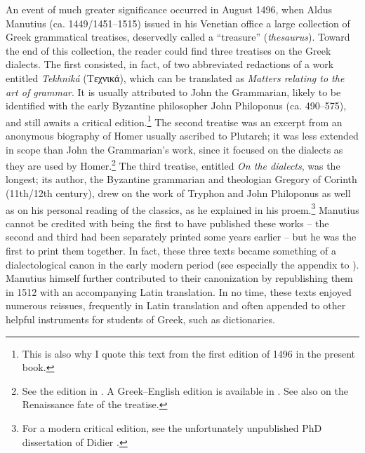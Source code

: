 An event of much greater significance occurred in August 1496, when Aldus Manutius (ca. 1449/1451–1515) issued in his Venetian office a large collection of Greek grammatical treatises, deservedly called a “treasure” (\textit{thesaurus}). Toward the end of this collection, the reader could find three treatises on the Greek dialects. The first consisted, in fact, of two abbreviated redactions of a work entitled \textit{Tekhniká} (Tεχνικά), which can be translated as \textit{Matters relating to the art of grammar}. It is usually attributed to John the Grammarian, likely to be identified with the early Byzantine philosopher John Philoponus (ca. 490–575), and still awaits a critical edition.\footnote{This is also why I quote this text from the first edition of 1496 in the present book.} The second treatise was an excerpt from an anonymous biography of Homer usually ascribed to Plutarch; it was less extended in scope than John the Grammarian’s work, since it focused on the dialects as they are used by Homer.\footnote{See the edition in \citet{Kindstrand1990}. A Greek–English edition is available in \citet{Keaney1996}. See also \citet{VanRooy2018c} on the Renaissance fate of the treatise.} The third treatise, entitled \textit{On the dialects}, was the longest; its author, the Byzantine grammarian and theologian Gregory of Corinth (11th/12th century), drew on the work of Tryphon and John Philoponus as well as on his personal reading of the classics, as he explained in his proem.\footnote{For a modern critical edition, see the unfortunately unpublished PhD dissertation of Didier \citet{Xhardez1991}.} Manutius cannot be credited with being the first to have published these works – the second and third had been separately printed some years earlier – but he was the first to print them together. In fact, these three texts became something of a dialectological canon in the early modern period (see especially the appendix to \citealt{Trovato1984}). Manutius himself further contributed to their canonization by republishing them in 1512 with an accompanying Latin translation. In no time, these texts enjoyed numerous reissues, frequently in Latin translation and often appended to other helpful instruments for students of Greek, such as dictionaries.

